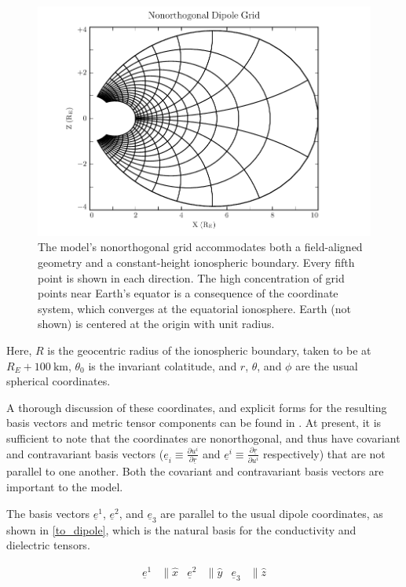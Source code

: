 \documentclass[draft,linenumbers]{agujournal}
\begin{document}
\begin{figure}
    \begin{center}
    \includegraphics[width=\textwidth]{figures/fig_grid.pdf}
    \caption{
        The model's nonorthogonal grid accommodates both a field-aligned geometry and a constant-height ionospheric boundary. Every fifth point is shown in each direction. The high concentration of grid points near Earth's equator is a consequence of the coordinate system, which converges at the equatorial ionosphere. Earth (not shown) is centered at the origin with unit radius.
    }
    \label{fig_grid}
    \end{center}
\end{figure}

Here, $R$ is the geocentric radius of the ionospheric boundary, taken to be at $R_E + \SI{100}{\km}$, $\theta_0$ is the invariant colatitude, and $r$, $\theta$, and $\phi$ are the usual spherical coordinates.

A thorough discussion of these coordinates, and explicit forms for the resulting basis vectors and metric tensor components can be found in \citet{lysak_2004}. At present, it is sufficient to note that the coordinates are nonorthogonal, and thus have covariant and contravariant basis vectors (${\underline{e}_i \equiv \frac{\partial u^i}{\partial \underline{r}}}$ and ${\underline{e}^i \equiv \frac{\partial \underline{r}}{\partial u^i}}$ respectively) that are not parallel to one another. Both the covariant and contravariant basis vectors are important to the model.

The basis vectors $\underline{e}^1$, $\underline{e}^2$, and $\underline{e}_3$ are parallel to the usual dipole coordinates, as shown in \cref{to_dipole}, which is the natural basis for the conductivity and dielectric tensors.
\begin{linenomath*}
\begin{align}
    \label{to_dipole}
    \underline{e}^1 &\parallel \hat{x} &
    \underline{e}^2 &\parallel \hat{y} &
    \underline{e}_3 &\parallel \hat{z}
\end{align}
\end{linenomath*}
\end{document}
